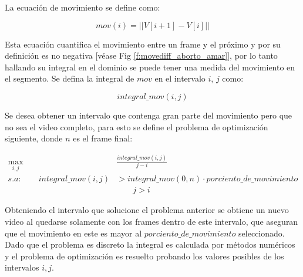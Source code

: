 La ecuación de movimiento se define como:

\begin{equation}
mov(i) = || V[i+1] - V[i] ||
\end{equation}

Esta ecuación cuantifica el movimiento entre un frame y el próximo y por su definición es no negativa [véase Fig \ref{f:movediff_aborto_amar}], 
por lo tanto hallando su integral en el dominio se puede tener una medida del movimiento en el segmento.
Se defina la integral de $mov$ en el intervalo $i$, $j$ como:

\begin{equation}
integral\_mov(i,j)
\end{equation}

Se desea obtener un intervalo que contenga gran parte del movimiento pero que no sea el video completo, para esto 
se define el problema de optimización siguiente, donde $n$ es el frame final:

\begin{align}
\max_{i,j} &\frac{integral\_mov(i,j)}{j-i} \\
s.a: \qquad integral\_mov(i,j) &> integral\_mov(0,n) \cdot porciento\_de\_movimiento \\
& \qquad j > i
\end{align}

Obteniendo el intervalo que solucione el problema anterior se obtiene un nuevo video al quedarse solamente con los 
frames dentro de este intervalo, que aseguran que el movimiento en este es mayor al $porciento\_de\_movimiento$ seleccionado.
Dado que el problema es discreto la integral es calculada por métodos numéricos y el problema de optimización es 
resuelto probando los valores posibles de los intervalos $i,j$.

